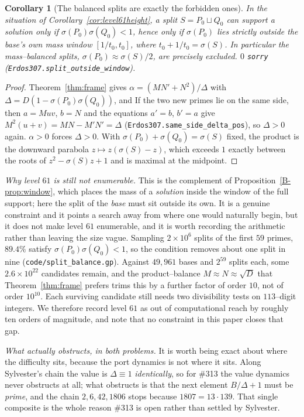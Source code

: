 \documentclass[11pt]{article}
\newtheorem{corollary}[theorem]{Corollary}
\theoremstyle{definition}
\begin{document}
\begin{corollary}[The balanced splits are exactly the forbidden ones]\label{cor:splitbalance}
In the situation of Corollary~\ref{cor:level61height}, a split $S=P_0\sqcup Q_0$ can support a
solution only if $\sigma(P_0)\sigma(Q_0)<1$, hence only if $\sigma(P_0)$ lies strictly \emph{outside}
the base's own mass window $[1/t_0,t_0]$, where $t_0+1/t_0=\sigma(S)$. In particular the
mass--balanced splits, $\sigma(P_0)\approx\sigma(S)/2$, are precisely excluded. $0$ \texttt{sorry}
\textup{(\texttt{Erdos307.split\_outside\_window})}.
\end{corollary}
\begin{proof}
Theorem~\ref{thm:frame} gives $\alpha=(MN'+N^2)/\Delta$ with $\Delta=D(1-\sigma(P_0)\sigma(Q_0))$, and
If the two new primes lie on the same side, then $a=Muv$, $b=N$ and the equations $a'=b$, $b'=a$ give
$M^2(u+v)=MN-M'N'=\Delta$ \textup{(}\texttt{Erdos307.same\_side\_delta\_pos}\textup{)}, so $\Delta>0$ again.
$\alpha>0$ forces $\Delta>0$. With $\sigma(P_0)+\sigma(Q_0)=\sigma(S)$ fixed, the product is the
downward parabola $z\mapsto z(\sigma(S)-z)$, which exceeds $1$ exactly between the roots of
$z^2-\sigma(S)z+1$ and is maximal at the midpoint.
\end{proof}

\emph{Why level $61$ is still not enumerable.} This is the complement of Proposition~\ref{B-prop:window}, which places the mass of a \emph{solution}
inside the window of the full support; here the split of the \emph{base} must sit outside its own.
It is a genuine constraint and it points a search away from where one would naturally begin, but it
does not make level $61$ enumerable, and it is worth recording the arithmetic rather than leaving the
size vague. Sampling $2\times10^{6}$ splits of the first $59$ primes, $89.4\%$ satisfy
$\sigma(P_0)\sigma(Q_0)<1$, so the condition removes about one split in nine
\textup{(\texttt{code/split\_balance.gp})}. Against $49{,}961$ bases and $2^{59}$ splits each, some
$2.6\times10^{22}$ candidates remain, and the product--balance $M\approx N\approx\sqrt D$ that
Theorem~\ref{thm:frame} prefers trims this by a further factor of order $10$, not of order $10^{10}$.
Each surviving candidate still needs two divisibility tests on $113$--digit integers. We therefore
record level $61$ as out of computational reach by roughly ten orders of magnitude, and note that no
constraint in this paper closes that gap.


\emph{What actually obstructs, in both problems.} It is worth being exact about where the difficulty sits, because the port dynamics is not where it
sits. Along Sylvester's chain the value is $\Delta\equiv1$ \emph{identically}, so for \#313 the value
dynamics never obstructs at all; what obstructs is that the next element $B/\Delta+1$ must be
\emph{prime}, and the chain $2,6,42,1806$ stops because $1807=13\cdot139$. That single composite is
the whole reason \#313 is open rather than settled by Sylvester.
\end{document}

